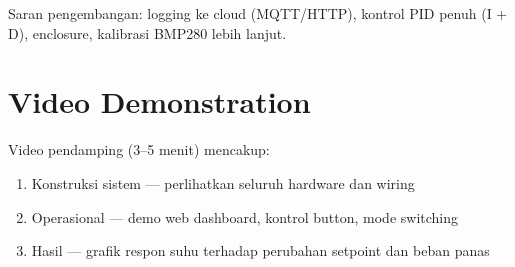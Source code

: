 \documentclass[11pt,a4paper]{article}
\begin{document}
Saran pengembangan: logging ke cloud (MQTT/HTTP), kontrol PID penuh (I + D), enclosure, kalibrasi BMP280 lebih lanjut.

\section{Video Demonstration}

Video pendamping (3--5 menit) mencakup:
\begin{enumerate}
    \item Konstruksi sistem --- perlihatkan seluruh hardware dan wiring
    \item Operasional --- demo web dashboard, kontrol button, mode switching
    \item Hasil --- grafik respon suhu terhadap perubahan setpoint dan beban panas
\end{enumerate}
\end{document}
